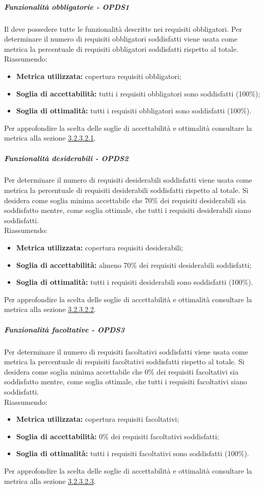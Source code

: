 \documentclass[PianoDiQualifica.tex]{subfiles}
\begin{document}
				\subparagraph{Funzionalità obbligatorie - OPDS1}
				Il  deve possedere tutte le funzionalità descritte nei requisiti obbligatori. Per determinare il numero di requisiti obbligatori soddisfatti viene usata
				come metrica la percentuale di requisiti obbligatori soddisfatti rispetto al totale. \\
				Riassumendo:
				\begin{itemize}
				\item \textbf{Metrica utilizzata:} copertura requisiti obbligatori;
				\item \textbf{Soglia di accettabilità:} tutti i requisiti obbligatori sono soddisfatti (100\%);
				\item \textbf{Soglia di ottimalità:} tutti i requisiti obbligatori sono soddisfatti (100\%).
				\end{itemize}
				Per approfondire la scelta delle soglie di accettabilità e ottimalità consultare la metrica alla sezione \hyperlink{req_obbligatori}{3.2.3.2.1}.

				\subparagraph{Funzionalità desiderabili - OPDS2}
				Per determinare il numero di requisiti desiderabili soddisfatti viene usata come metrica la percentuale di requisiti desiderabili soddisfatti rispetto al totale.
				Si desidera come soglia minima accettabile che 70\% dei requisiti desiderabili sia soddisfatto mentre, come soglia ottimale, che tutti i requisiti desiderabili siano soddisfatti. \\
				Riassumendo:
				\begin{itemize}
				\item \textbf{Metrica utilizzata:} copertura requisiti desiderabili;
				\item \textbf{Soglia di accettabilità:} almeno 70\% dei requisiti desiderabili soddisfatti;
				\item \textbf{Soglia di ottimalità:} tutti i requisiti desiderabili sono soddisfatti (100\%).
				\end{itemize}
				Per approfondire la scelta delle soglie di accettabilità e ottimalità consultare la metrica alla sezione \hyperlink{req_desiderabili}{3.2.3.2.2}.


				\subparagraph{Funzionalità facoltative - OPDS3}
				Per determinare il numero di requisiti facoltativi soddisfatti viene usata come metrica la percentuale di requisiti facoltativi soddisfatti rispetto al totale.
				Si desidera come soglia minima accettabile che 0\% dei requisiti facoltativi sia soddisfatto mentre, come soglia ottimale, che tutti i requisiti facoltativi siano soddisfatti. \\
				Riassumendo:
				\begin{itemize}
				\item \textbf{Metrica utilizzata:} copertura requisiti facoltativi;
				\item \textbf{Soglia di accettabilità:}  0\% dei requisiti facoltativi soddisfatti;
				\item \textbf{Soglia di ottimalità:} tutti i requisiti facoltativi sono soddisfatti (100\%).
				\end{itemize}
				Per approfondire la scelta delle soglie di accettabilità e ottimalità consultare la metrica alla sezione \hyperlink{req_facoltativi}{3.2.3.2.3}.
\end{document}
